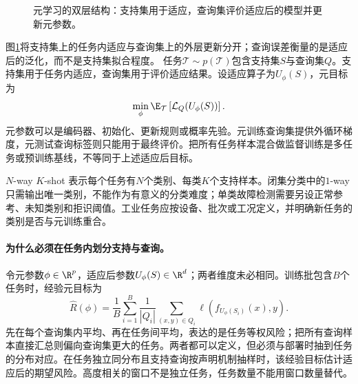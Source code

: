\begin{figure}[htbp]
\centering
{}
\caption{元学习的双层结构：支持集用于适应，查询集评价适应后的模型并更新元参数。}
\label{fig:meta-support-query}
\end{figure}
图\ref{fig:meta-support-query}将支持集上的任务内适应与查询集上的外层更新分开；查询误差衡量的是适应后的泛化，而不是支持集拟合程度。
任务$\mathcal T\sim p(\mathcal T)$包含支持集$S$与查询集$Q$。支持集用于任务内适应，查询集用于评价适应结果。设适应算子为$U_\phi(S)$，元目标为
\begin{equation}
 \min_\phi\E_{\mathcal T}\left[\mathcal L_Q(U_\phi(S))\right].
\end{equation}
元参数可以是编码器、初始化、更新规则或概率先验\cite{hospedales2022meta}。元训练查询集提供外循环梯度，元测试查询标签则只能用于最终评价。把所有任务样本混合做监督训练是多任务或预训练基线，不等同于上述适应后目标。

$N$-way $K$-shot 表示每个任务有$N$个类别、每类$K$个支持样本。闭集分类中的$1$-way只需输出唯一类别，不能作为有意义的分类难度；单类故障检测需要另设正常参考、未知类别和拒识阈值。工业任务应按设备、批次或工况定义，并明确新任务的类别是否与元训练重合。

\paragraph{为什么必须在任务内划分支持与查询。}
令元参数$\phi\in\R^p$，适应后参数$U_\phi(S)\in\R^d$；两者维度未必相同。训练批包含$B$个任务时，经验元目标为
\begin{equation}
 \widehat R(\phi)=\frac1B\sum_{i=1}^B
 \frac1{|Q_i|}\sum_{(x,y)\in Q_i}
 \ell(f_{U_\phi(S_i)}(x),y).
\end{equation}
先在每个查询集内平均、再在任务间平均，表达的是任务等权风险；把所有查询样本直接汇总则偏向查询集更大的任务。两者都可以定义，但必须与部署时抽到任务的分布对应。在任务独立同分布且支持查询按声明机制抽样时，该经验目标估计适应后的期望风险。高度相关的窗口不是独立任务，任务数量不能用窗口数量替代。

